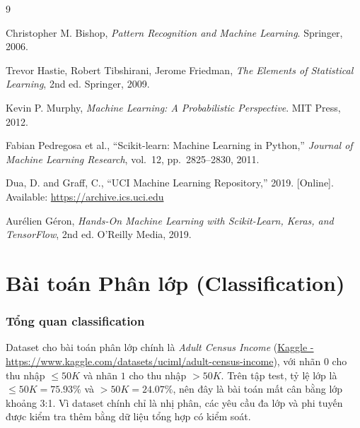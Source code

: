\documentclass[12pt,a4paper]{article}
\newcommand{\adult}{\textit{Adult Census Income }}
\let\oldpart\part
\renewcommand{\part}{%
  \setcounter{section}{0}%
  \setcounter{subsection}{0}%
  \oldpart
}
\begin{document}

\begin{thebibliography}{9}

  Christopher M. Bishop,
  \textit{Pattern Recognition and Machine Learning}.
  Springer, 2006.

  Trevor Hastie, Robert Tibshirani, Jerome Friedman,
  \textit{The Elements of Statistical Learning}, 2nd ed.
  Springer, 2009.

  Kevin P. Murphy,
  \textit{Machine Learning: A Probabilistic Perspective}.
  MIT Press, 2012.

  Fabian Pedregosa et al.,
  ``Scikit-learn: Machine Learning in Python,''
  \textit{Journal of Machine Learning Research}, vol.~12, pp.~2825--2830, 2011.

  Dua, D. and Graff, C.,
  ``UCI Machine Learning Repository,'' 2019.
  [Online]. Available: \url{https://archive.ics.uci.edu}

  Aurélien Géron,
  \textit{Hands-On Machine Learning with Scikit-Learn, Keras, and TensorFlow},
  2nd ed. O'Reilly Media, 2019.
  
\end{thebibliography}


\newpage
\part{Bài toán Phân lớp (Classification)}

\section{Tổng quan classification}



Dataset cho bài toán phân lớp chính là \adult (\url{Kaggle - https://www.kaggle.com/datasets/uciml/adult-census-income}), với nhãn $0$ cho thu nhập $\leq 50K$ và nhãn $1$ cho thu nhập $>50K$. Trên tập test, tỷ lệ lớp là $\leq 50K=75.93\%$ và $>50K=24.07\%$, nên đây là bài toán mất cân bằng lớp khoảng 3:1. Vì dataset chính chỉ là nhị phân, các yêu cầu đa lớp và phi tuyến được kiểm tra thêm bằng dữ liệu tổng hợp có kiểm soát.
\end{document}
